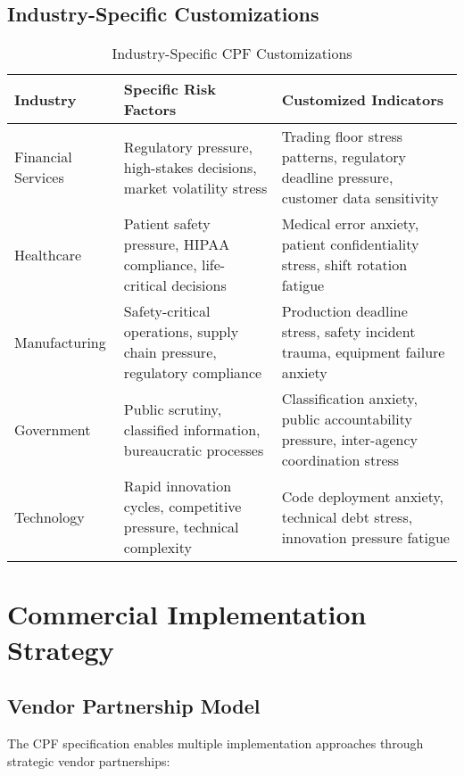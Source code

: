 \documentclass[10pt,twocolumn]{IEEEtran}
\begin{document}
\subsection{Industry-Specific Customizations}

\begin{table}[h]
\centering
\caption{Industry-Specific CPF Customizations}
\label{tab:industry_customizations}
\begin{tabular}{@{}lp{6cm}p{6cm}@{}}
\toprule
\textbf{Industry} & \textbf{Specific Risk Factors} & \textbf{Customized Indicators} \\
\midrule
Financial Services & Regulatory pressure, high-stakes decisions, market volatility stress & Trading floor stress patterns, regulatory deadline pressure, customer data sensitivity \\
\midrule
Healthcare & Patient safety pressure, HIPAA compliance, life-critical decisions & Medical error anxiety, patient confidentiality stress, shift rotation fatigue \\
\midrule
Manufacturing & Safety-critical operations, supply chain pressure, regulatory compliance & Production deadline stress, safety incident trauma, equipment failure anxiety \\
\midrule
Government & Public scrutiny, classified information, bureaucratic processes & Classification anxiety, public accountability pressure, inter-agency coordination stress \\
\midrule
Technology & Rapid innovation cycles, competitive pressure, technical complexity & Code deployment anxiety, technical debt stress, innovation pressure fatigue \\
\bottomrule
\end{tabular}
\end{table}

\section{Commercial Implementation Strategy}

\subsection{Vendor Partnership Model}

The CPF specification enables multiple implementation approaches through strategic vendor partnerships:
\end{document}
